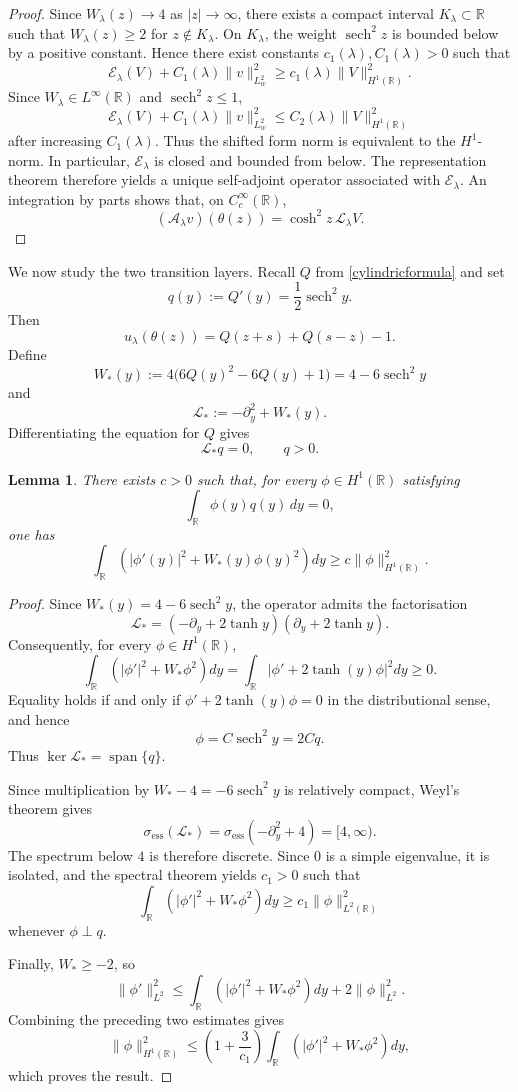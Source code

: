 \documentclass[11pt,a4paper]{article}
\DeclareMathOperator{\sech}{sech}
\numberwithin{equation}{section}
\theoremstyle{plain}
\newtheorem{lemma}[theorem]{Lemma}
\theoremstyle{remark}
\begin{document}
\begin{proof}
Since $W_\lambda(z)\to4$ as $|z|\to\infty$, there exists a compact
interval $K_\lambda\subset\mathbb R$ such that $W_\lambda(z)\ge2$ for $z\notin K_\lambda$. On $K_\lambda$, the weight $\sech^2 z$ is bounded below by a positive
constant. Hence there exist constants $c_1(\lambda),C_1(\lambda)>0$ such
that
$$
\mathcal E_\lambda(V)
+
C_1(\lambda)\|v\|_{L_w^2}^2
\ge
c_1(\lambda)\|V\|_{H^1(\mathbb R)}^2.
$$
Since $W_\lambda\in L^\infty(\mathbb R)$ and $\sech^2z\leq1$,
$$
\mathcal E_\lambda(V)
+
C_1(\lambda)\|v\|_{L_w^2}^2
\le
C_2(\lambda)
\|V\|_{H^1(\mathbb R)}^2
$$
after increasing $C_1(\lambda)$. Thus the shifted form norm is
equivalent to the $H^1$-norm. In particular,
$\mathcal E_\lambda$ is closed and bounded from below.
The representation theorem therefore yields a unique self-adjoint
operator associated with $\mathcal E_\lambda$. An integration by
parts shows that, on $C_c^\infty(\mathbb R)$,
$$
(\mathcal A_\lambda v)(\theta(z))
=
\cosh^2z\,\mathscr L_\lambda V.
$$
\end{proof}


We now study the two transition layers. Recall $Q$ from \eqref{cylindricformula} and set
$$
q(y):=Q'(y)=\frac12\sech^2y.
$$
Then
$$
u_\lambda(\theta(z))
=
Q(z+s)+Q(s-z)-1.
$$
Define
$$
W_*(y)
:=
4\bigl(6Q(y)^2-6Q(y)+1\bigr)
=
4-6\sech^2y
$$
and
$$
\mathscr L_*:=-\partial_y^2+W_*(y).
$$
Differentiating the equation for $Q$ gives
$$
\mathscr L_*q=0,
\qquad
q>0.
$$
\begin{lemma}
\label{singlefrontlem}
There exists $c>0$ such that, for every $\phi\in H^1(\mathbb R)$
satisfying
$$
\int_{\mathbb R}\phi(y)q(y)\,dy=0,
$$
one has
$$
\int_{\mathbb R}
\left(
|\phi'(y)|^2+W_*(y)\phi(y)^2
\right)dy
\geq
c\|\phi\|_{H^1(\mathbb R)}^2.
$$
\end{lemma}

\begin{proof}
Since $W_*(y)=4-6\sech^2 y$, the operator admits the factorisation
$$
\mathscr L_*
=
\left(-\partial_y+2\tanh y\right)
\left(\partial_y+2\tanh y\right).
$$
Consequently, for every $\phi\in H^1(\mathbb R)$,
$$
\int_{\mathbb R}
\left(
|\phi'|^2+W_*\phi^2
\right)dy
=
\int_{\mathbb R}
\left|\phi'+2\tanh(y)\phi\right|^2dy
\geq 0.
$$
Equality holds if and only if $\phi'+2\tanh(y)\phi=0$ in the distributional sense, and hence
$$
\phi=C\sech^2 y=2Cq.
$$
Thus $\ker\mathscr L_*=\operatorname{span}\{q\}$. 

Since multiplication by $W_*-4=-6\sech^2y$ is relatively compact, Weyl's theorem gives
$$
\sigma_{\mathrm{ess}}(\mathscr L_*)=\sigma_{\mathrm{ess}}(-\partial_y^2+4)=[4,\infty).
$$
The spectrum below $4$ is therefore discrete. Since $0$ is a simple
eigenvalue, it is isolated, and the spectral theorem yields $c_1>0$
such that
$$
\int_{\mathbb R}
\left(
|\phi'|^2+W_*\phi^2
\right)dy
\geq
c_1\|\phi\|_{L^2(\mathbb R)}^2
$$
whenever $\phi\perp q$.

Finally, $W_*\geq-2$, so
$$
\|\phi'\|_{L^2}^2
\leq
\int_{\mathbb R}
\left(
|\phi'|^2+W_*\phi^2
\right)dy
+
2\|\phi\|_{L^2}^2.
$$
Combining the preceding two estimates gives
$$
\|\phi\|_{H^1(\mathbb R)}^2
\leq
\left(1+\frac{3}{c_1}\right)
\int_{\mathbb R}
\left(
|\phi'|^2+W_*\phi^2
\right)dy,
$$
which proves the result.
\end{proof}
\end{document}
